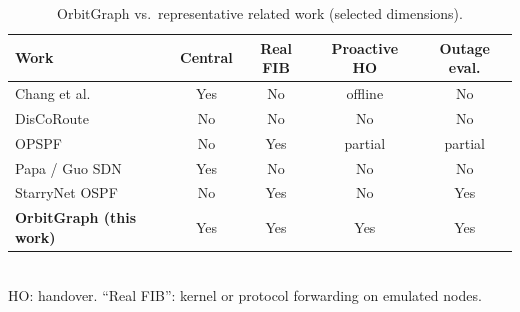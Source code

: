 \begin{table}[!t]
  \centering
  \caption{OrbitGraph vs.\ representative related work (selected dimensions).}
  \label{tab:related-positioning}
  \renewcommand{\arraystretch}{1.1}
  \footnotesize
  \begin{tabular}{@{}lcccc@{}}
    \hline
    Work & Central & Real FIB & Proactive HO & Outage eval. \\
    \hline
    Chang et al.~\cite{seong:topological-design:1995} & Yes & No  & offline & No \\
    DisCoRoute~\cite{gregory:satellite-routing:2022} & No  & No  & No      & No \\
    OPSPF~\cite{pam:opspf:2019} & No  & Yes & partial & partial \\
    Papa / Guo SDN~\cite{papa:sdn-cpp:2018,guo:spda:2022} & Yes & No  & No      & No \\
    StarryNet OSPF~\cite{lai2023starrynet} & No  & Yes & No      & Yes \\
    \textbf{OrbitGraph (this work)} & Yes & Yes & Yes     & Yes \\
    \hline
  \end{tabular}
  \\[0.4em]
  \footnotesize
  HO: handover. ``Real FIB'': kernel or protocol forwarding on emulated nodes.
\end{table}
